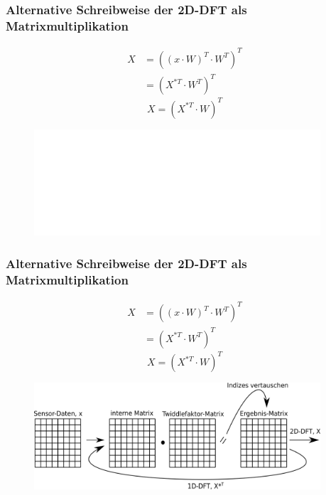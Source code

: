 \multipleframe
\begin{frame}\frametitle{Alternative Schreibweise der 2D-DFT als Matrixmultiplikation}
 \begin{align*}
 X &= \left(\left(x\cdot W\right)^T\cdot W^T\right)^T \label{eq:MatMultTranspose}\\
   &= \left(X^{*T} \cdot W^T\right)^T \nonumber
\end{align*}
\pause
\begin{equation*}
 \boxed{X = \left(X^{*T} \cdot W\right)^T}
\end{equation*}
\begin{figure}[htbp]
 \centering
 \includegraphics[width=0.95\textwidth]{img/MatMultTranspose2_dummy.png}
\end{figure}
\end{frame}


\begin{frame}\frametitle{Alternative Schreibweise der 2D-DFT als Matrixmultiplikation}
 \begin{align*}
 X &= \left(\left(x\cdot W\right)^T\cdot W^T\right)^T \label{eq:MatMultTranspose}\\
   &= \left(X^{*T} \cdot W^T\right)^T \nonumber
\end{align*}
\begin{equation*}
 \boxed{X = \left(X^{*T} \cdot W\right)^T}
\end{equation*}
\begin{figure}[htbp]
 \centering
 \includegraphics[width=0.95\textwidth]{img/MatMultTranspose2.png}
\end{figure}
\end{frame}
\restoreframe


